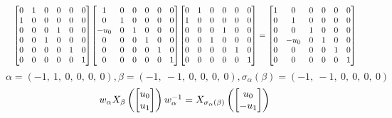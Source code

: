 \documentclass[11pt]{article}
\theoremstyle{definition}
\begin{document}
\[
\scaletoalign{\textwidth}{{\left[\begin{matrix}0 & 1 & 0 & 0 & 0 & 0\\1 & 0 & 0 & 0 & 0 & 0\\0 & 0 & 0 & 1 & 0 & 0\\0 & 0 & 1 & 0 & 0 & 0\\0 & 0 & 0 & 0 & 1 & 0\\0 & 0 & 0 & 0 & 0 & 1\end{matrix}\right]} {\left[\begin{matrix}1 & 0 & 0 & 0 & 0 & 0\\0 & 1 & 0 & 0 & 0 & 0\\- u_{0} & 0 & 1 & 0 & 0 & 0\\0 & 0 & 0 & 1 & 0 & 0\\0 & 0 & 0 & 0 & 1 & 0\\0 & 0 & 0 & 0 & 0 & 1\end{matrix}\right]} {\left[\begin{matrix}0 & 1 & 0 & 0 & 0 & 0\\1 & 0 & 0 & 0 & 0 & 0\\0 & 0 & 0 & 1 & 0 & 0\\0 & 0 & 1 & 0 & 0 & 0\\0 & 0 & 0 & 0 & 1 & 0\\0 & 0 & 0 & 0 & 0 & 1\end{matrix}\right]} = {\left[\begin{matrix}1 & 0 & 0 & 0 & 0 & 0\\0 & 1 & 0 & 0 & 0 & 0\\0 & 0 & 1 & 0 & 0 & 0\\0 & - u_{0} & 0 & 1 & 0 & 0\\0 & 0 & 0 & 0 & 1 & 0\\0 & 0 & 0 & 0 & 0 & 1\end{matrix}\right]}}
\]
\[
\alpha = \left( -1, \  1, \  0, \  0, \  0, \  0\right), \beta = \left( -1, \  -1, \  0, \  0, \  0, \  0\right), \sigma_{\alpha}(\beta) = \left( -1, \  -1, \  0, \  0, \  0, \  0\right)
\]
\[
\scaletoalign{\textwidth}{w_{\alpha} X_{\beta}\left(\left[\begin{matrix}u_{0}\\u_{1}\end{matrix}\right]\right) w_{\alpha}^{-1} = X_{\sigma_{\alpha}\left(\beta\right)}\left(\left[\begin{matrix}u_{0}\\- u_{1}\end{matrix}\right]\right)}
\]
\end{document}
